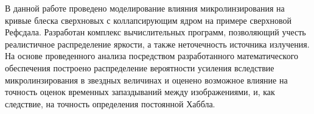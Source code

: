 
В данной работе проведено моделирование влияния микролинзирования на кривые блеска сверхновых с коллапсирующим ядром на примере сверхновой Рефсдала. Разработан комплекс вычислительных программ, позволяющий учесть реалистичное распределение яркости, а также неточечность источника излучения. На основе проведенного анализа посредством разработанного математического обеспечения построено распределение вероятности усиления вследствие микролинзирования в звездных величинах и оценено возможное влияние на точность оценок временных запаздываний между изображениями, и, как следствие, на точность определения постоянной Хаббла.


